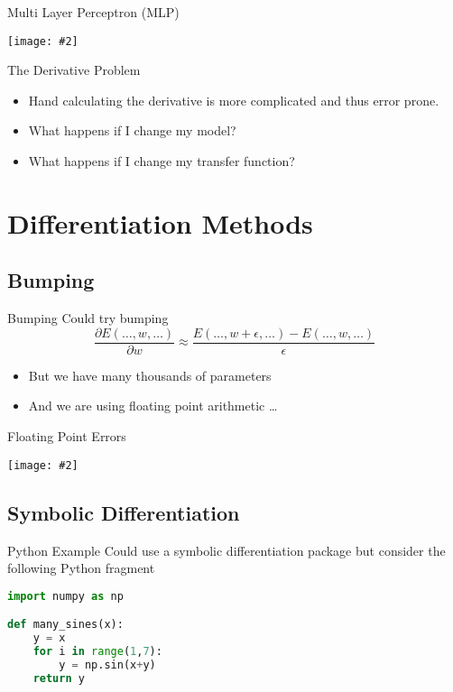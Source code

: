 \documentclass{beamer}
\newcommand {\framedgraphic}[2] {
    \begin{frame}{#1}
        \begin{center}
            \texttt{[image: \#2]}
        \end{center}
    \end{frame}
}
\begin{document}
\framedgraphic{Multi Layer Perceptron (MLP)}{diagrams/Fita2.png}

\begin{frame}[fragile]{The Derivative Problem}
\begin{itemize}
\item Hand calculating the derivative is more complicated and thus error prone.
\item What happens if I change my model?
\item What happens if I change my transfer function?
\end{itemize}
\end{frame}

\section{Differentiation Methods}

\subsection{Bumping}

\begin{frame}{Bumping}
Could try bumping
$$
\frac{\partial E(\ldots, w, \ldots)}{\partial w} \approx \frac{E(\ldots, w + \epsilon, \ldots) - E(\ldots, w, \ldots)}{\epsilon}
$$
\begin{itemize}
\item
But we have many thousands of parameters
\item
And we are using floating point arithmetic \ldots
\end{itemize}
\end{frame}

\framedgraphic{Floating Point Errors}{diagrams/13a2bd186a0e123f040da9491fa98684.png}

\subsection{Symbolic Differentiation}

\begin{frame}[fragile]{Python Example}
  Could use a symbolic differentiation package but consider the
  following Python fragment
\begin{lstlisting}[language=Python]
import numpy as np

def many_sines(x):
    y = x
    for i in range(1,7):
        y = np.sin(x+y)
    return y
\end{lstlisting}
\end{frame}
\end{document}
